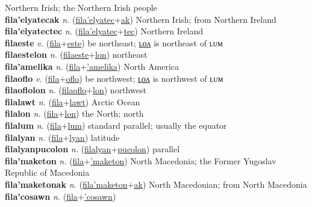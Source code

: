 Northern Irish; the Northern Irish people \label{fila'elyatec} \\
\textbf{fila'elyatecak} \textit{n.} (\hyperref[fila'elyatec]{fila'elyatec}+\hyperref[ak]{ak})
Northern Irish; from Northern Ireland \label{fila'elyatecak} \\
\textbf{fila'elyatectec} \textit{n.} (\hyperref[fila'elyatec]{fila'elyatec}+\hyperref[tec]{tec})
Northern Ireland \label{fila'elyatectec} \\
\textbf{filaeste} \textit{v.} (\hyperref[fila]{fila}+\hyperref[este]{este})
be northeast; \hyperref[filaestelon]{ʟᴏᴧ} is northeast of ʟᴜᴍ \label{filaeste} \\
\textbf{filaestelon} \textit{n.} (\hyperref[filaeste]{filaeste}+\hyperref[lon]{lon})
northeast \label{filaestelon} \\
\textbf{fila'amelika} \textit{n.} (\hyperref[fila]{fila}+\hyperref['amelika]{'amelika})
North America \label{fila'amelika} \\
\textbf{filaoflo} \textit{v.} (\hyperref[fila]{fila}+\hyperref[oflo]{oflo})
be northwest; \hyperref[filaoflolon]{ʟᴏᴧ} is northwest of ʟᴜᴍ \label{filaoflo} \\
\textbf{filaoflolon} \textit{n.} (\hyperref[filaoflo]{filaoflo}+\hyperref[lon]{lon})
northwest \label{filaoflolon} \\
\textbf{filalawt} \textit{n.} (\hyperref[fila]{fila}+\hyperref[lawt]{lawt})
Arctic Ocean \label{filalawt} \\
\textbf{filalon} \textit{n.} (\hyperref[fila]{fila}+\hyperref[lon]{lon})
the North; north \label{filalon} \\
\textbf{filalum} \textit{n.} (\hyperref[fila]{fila}+\hyperref[lum]{lum})
standard parallel; usually the equator \label{filalum} \\
\textbf{filalyan} \textit{n.} (\hyperref[fila]{fila}+\hyperref[lyan]{lyan})
latitude \label{filalyan} \\
\textbf{filalyanpucolon} \textit{n.} (\hyperref[filalyan]{filalyan}+\hyperref[pucolon]{pucolon})
parallel \label{filalyanpucolon} \\
\textbf{fila'maketon} \textit{n.} (\hyperref[fila]{fila}+\hyperref['maketon]{'maketon})
North Macedonia; the Former Yugoslav Republic of Macedonia \label{fila'maketon} \\
\textbf{fila'maketonak} \textit{n.} (\hyperref[fila'maketon]{fila'maketon}+\hyperref[ak]{ak})
North Macedonian; from North Macedonia \label{fila'maketonak} \\
\textbf{fila'cosawn} \textit{n.} (\hyperref[fila]{fila}+\hyperref['cosawn]{'cosawn})
